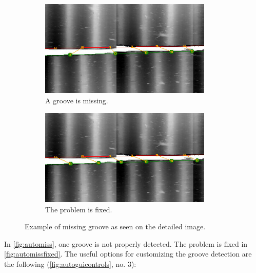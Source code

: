 \begin{figure}[!ht]
\centering
    \begin{subfigure}[t]{0.45\textwidth}
    \centering
    \includegraphics[width=0.9\textwidth]{images/auto-missing-groove}
    \caption{A groove is missing.}
    \label{fig:automiss}
    \end{subfigure}
    \begin{subfigure}[t]{0.45\textwidth}
    \centering
    \includegraphics[width=0.9\textwidth]{images/auto-missing-fixed}
    \caption{The problem is fixed.}
    \label{fig:automissfixed}
    \end{subfigure}
    \caption{Example of missing groove as seen on the detailed image.}
    \label{fig:automissgroove}
\end{figure}

In \autoref{fig:automiss}, one groove is not properly detected. The problem is fixed in \autoref{fig:automissfixed}. The useful options for customizing the groove detection are the following (\autoref{fig:autoguicontrols}, no. 3):

